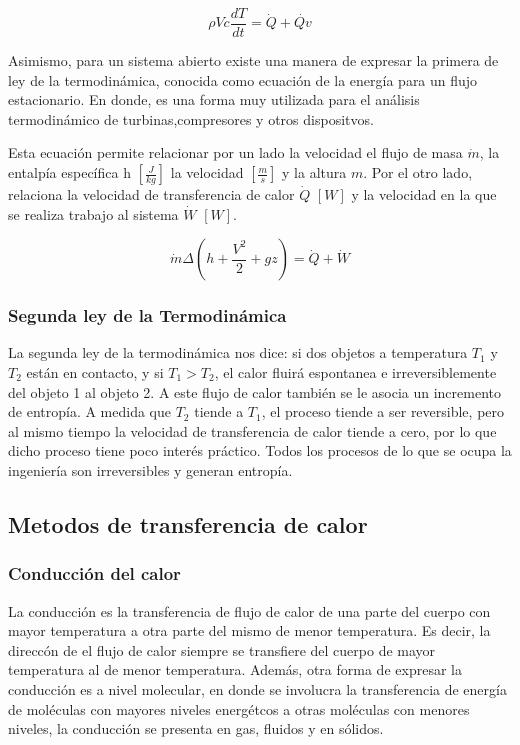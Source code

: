 \documentclass[12pt,letterpaper]{article}     %
\begin{document}
\begin{equation}
\rho V c \frac{dT}{ dt} = \dot{Q} + \dot{Qv}    
\label{eq:cambiotemperatura}
\end{equation}

\cite[p\ 6]{Mills} Asimismo, para un sistema abierto existe una manera de expresar la primera de ley  de la termodinámica, conocida como ecuación de la energía para un flujo estacionario. En donde, es una forma muy utilizada para el análisis termodinámico de turbinas,compresores y otros dispositvos.

Esta ecuación permite relacionar por un lado la velocidad el flujo de masa $\dot{m}$, la entalpía específica h $[\frac{J}{kg}]$ la velocidad $[ \frac{m}{s} ]$ y la altura $m$. Por el otro lado, relaciona la velocidad de transferencia de calor $\dot{Q}$ $[W]$ y la velocidad en la que se realiza trabajo al sistema $\dot{W}$ $[W]$.

\begin{equation}
    \dot{m}\Delta(h + \frac{V^2}{2} + gz) = \dot{Q} + \dot{W}
    \label{eq:energflujoestacionario}
\end{equation}

\subsubsection{Segunda ley de la Termodinámica}

\cite[p\ 7]{Mills} La segunda ley de la termodinámica nos dice: si dos objetos a temperatura $T_{1}$ y $T_{2}$ están en contacto, y si $T_{1} > T_{2}$, el calor fluirá espontanea e irreversiblemente del objeto 1 al objeto 2. A este flujo de calor también se le asocia un incremento de entropía. A medida que $T_{2}$ tiende a $T_{1}$, el proceso tiende a ser reversible, pero al mismo tiempo la velocidad de transferencia de calor tiende a cero, por lo que dicho proceso tiene poco interés práctico. Todos los procesos de lo que se ocupa la ingeniería son irreversibles y generan entropía.



\subsection{Metodos de transferencia de calor}

\subsubsection{Conducción del calor}
La conducción es la transferencia de flujo de calor de una parte del cuerpo con mayor temperatura a otra parte del mismo de menor temperatura. Es decir, la direccón de el flujo de calor siempre se transfiere del cuerpo de mayor temperatura al de menor temperatura. Además, otra forma de expresar la conducción es a nivel molecular, en donde se involucra la transferencia de energía de moléculas con mayores niveles energétcos a otras moléculas con menores niveles, la conducción se presenta en gas, fluidos y en sólidos.
\end{document}

